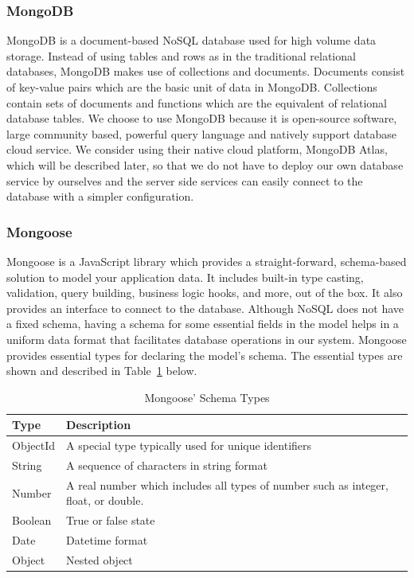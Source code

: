 \documentclass[12pt,oneside,openright,a4paper]{cpe-english-project}
\begin{document}
\subsubsection{MongoDB}

MongoDB is a document-based NoSQL database used for high volume data storage. Instead of using tables and rows as in the traditional relational databases, MongoDB makes use of collections and documents. Documents consist of key-value pairs which are the basic unit of data in MongoDB. Collections contain sets of documents and functions which are the equivalent of relational database tables. \cite{WhatisMongoDBIntroductionArchitectureFeaturesExample} We choose to use MongoDB because it is open-source software, large community based, powerful query language and natively support database cloud service. We consider using their native cloud platform, MongoDB Atlas, which will be described later, so that we do not have to deploy our own database service by ourselves and the server side services can easily connect to the database with a simpler configuration.

\subsubsection{Mongoose}

Mongoose is a JavaScript library which provides a straight-forward, schema-based solution to model your application data. It includes built-in type casting, validation, query building, business logic hooks, and more, out of the box. \cite{mongoose} It also provides an interface to connect to the database. Although NoSQL does not have a fixed schema, having a schema for some essential fields in the model helps in a uniform data format that facilitates database operations in our system. Mongoose provides essential types for declaring the model’s schema. The essential types are shown and described in Table~\ref{tbl:2MongooseSchemaTypes} below.

\begin{table}[H]
\caption{Mongoose’ Schema Types}\label{tbl:2MongooseSchemaTypes}
\begin{tabularx}{\textwidth}{l|X} \hline\hline
Type & Description \\ \hline\hline
ObjectId & A special type typically used for unique identifiers \\ \hline
String & A sequence of characters in string format \\ \hline
Number & A real number which includes all types of number such as integer, float, or double. \\ \hline
Boolean & True or false state \\ \hline
Date & Datetime format \\ \hline
Object & Nested object \\ \hline\hline
\end{tabularx}
\end{table}
\end{document}
